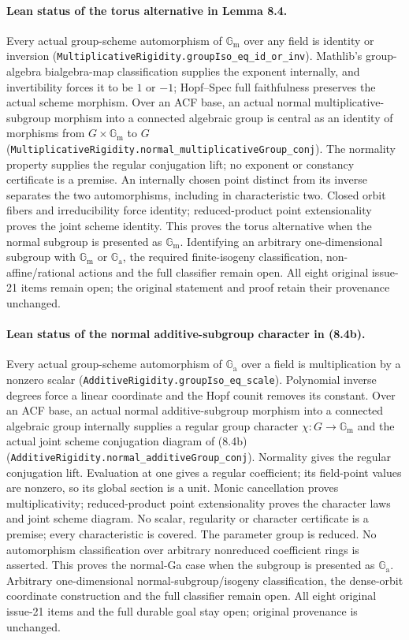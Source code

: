\documentclass[11pt,oneside]{article}
\theoremstyle{definition}
\theoremstyle{remark}
\newcommand{\Ga}{\mathbb G_{\mathrm a}}
\newcommand{\Gm}{\mathbb G_{\mathrm m}}
\newcommand{\lean}[1]{\nolinkurl{#1}}
\begin{document}
\paragraph{Lean status of the torus alternative in Lemma 8.4.}
Every actual group-scheme automorphism of $\Gm$ over any field is identity or inversion
(\lean{MultiplicativeRigidity.groupIso_eq_id_or_inv}). Mathlib's group-algebra bialgebra-map
classification supplies the exponent internally, and invertibility forces it to be $1$ or
$-1$; Hopf--Spec full faithfulness preserves the actual scheme morphism. Over an ACF base,
an actual normal multiplicative-subgroup morphism into a connected algebraic group is
central as an identity of morphisms from $G\times\Gm$ to $G$
(\lean{MultiplicativeRigidity.normal_multiplicativeGroup_conj}). The normality property
supplies the regular conjugation lift; no exponent or constancy certificate is a premise.
An internally chosen point distinct from its inverse separates the two automorphisms,
including in characteristic two. Closed orbit fibers and irreducibility force identity;
reduced-product point extensionality proves the joint scheme identity. This proves the
torus alternative when the normal subgroup is presented as $\Gm$. Identifying an arbitrary
one-dimensional subgroup with $\Gm$ or $\Ga$, the required finite-isogeny classification,
non-affine/rational actions and the full classifier remain open. All eight original issue-21
items remain open; the original statement and proof retain their provenance unchanged.

\paragraph{Lean status of the normal additive-subgroup character in (8.4b).}
Every actual group-scheme automorphism of $\Ga$ over a field is multiplication by a nonzero
scalar (\lean{AdditiveRigidity.groupIso_eq_scale}). Polynomial inverse degrees force a
linear coordinate and the Hopf counit removes its constant. Over an ACF base, an actual
normal additive-subgroup morphism into a connected algebraic group internally supplies
a regular group character $\chi:G\to\Gm$ and the actual joint scheme conjugation diagram
of (8.4b) (\lean{AdditiveRigidity.normal_additiveGroup_conj}). Normality gives the regular
conjugation lift. Evaluation at one gives a regular coefficient; its field-point values
are nonzero, so its global section is a unit. Monic cancellation proves multiplicativity;
reduced-product point extensionality proves the character laws and joint scheme diagram.
No scalar, regularity or character certificate is a premise; every characteristic is
covered. The parameter group is reduced. No automorphism classification over arbitrary
nonreduced coefficient rings is asserted. This proves the normal-Ga case when the subgroup
is presented as $\Ga$. Arbitrary one-dimensional normal-subgroup/isogeny classification,
the dense-orbit coordinate construction and the full classifier remain open. All eight
original issue-21 items and the full durable goal stay open; original provenance is unchanged.
\end{document}
